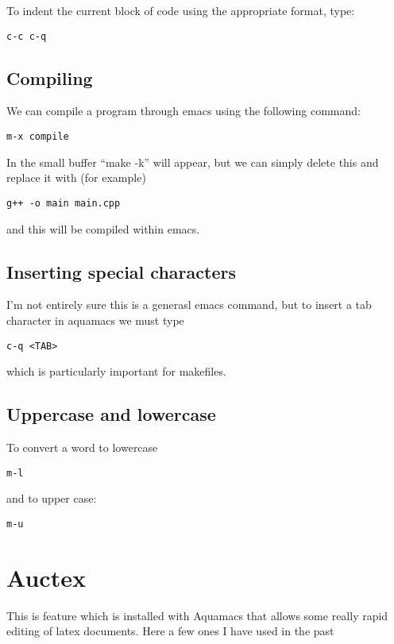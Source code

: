 \documentclass[a4paper, 10pt]{article}
\begin{document}
To indent the current block of code using the appropriate format, type:
\begin{verbatim}
c-c c-q
 \end{verbatim}
 
 
\subsection*{Compiling}

We can compile a program through emacs using the following command:
\begin{verbatim}
m-x compile
 \end{verbatim}
In the small buffer ``make -k'' will appear, but we can simply delete this and replace it with (for example) 
\begin{verbatim}
g++ -o main main.cpp
 \end{verbatim}
and this will be compiled within emacs.
 
\subsection*{Inserting special characters}

I'm not entirely sure this is a generasl emacs command, but to insert a tab character in aquamacs we must type
\begin{verbatim}
c-q <TAB>
 \end{verbatim}
which is particularly important for makefiles.  

\subsection*{Uppercase and lowercase}
\label{sec:uppercase-lowercase}

To convert a word to lowercase
\begin{verbatim}
m-l
\end{verbatim}
and to upper case:
\begin{verbatim}
m-u
\end{verbatim}

 \section*{Auctex}
 
This is feature which is installed with Aquamacs that allows some really rapid editing of latex documents. Here a few ones I have used in the past
\end{document}
